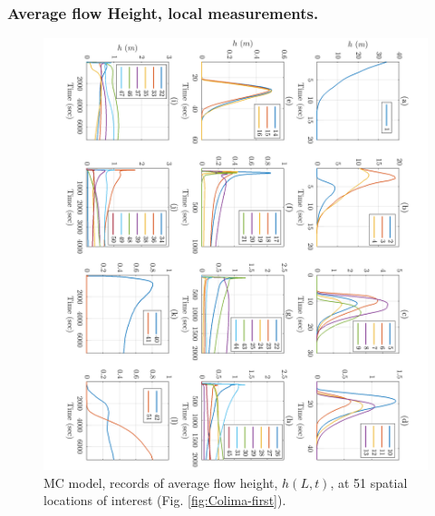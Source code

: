 \documentclass{article}
\begin{document}
\subsubsection{Average flow Height, local measurements.}
\begin{figure}[H]
         \centering
        \includegraphics[width=1\textwidth]{MC&VS_51/Height_MC.png}
        \caption{MC model, records of average flow height, $h(L,t)$, at 51 spatial locations of interest (Fig. \ref{fig:Colima-first}).}
        \label{fig:BAF-H-MC}
\end{figure}
\end{document}
